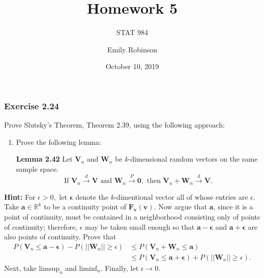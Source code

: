 \documentclass[12pt,]{article}
\title{Homework 5}
\subtitle{STAT 984}
\author{Emily Robinson}
\date{October 10, 2019}
\begin{document}
\maketitle

\hypertarget{exercise-2.24}{%
\subsubsection{Exercise 2.24}\label{exercise-2.24}}

Prove Slutsky's Theorem, Theorem 2.39, using the following approach:

\begin{enumerate}
\def\labelenumi{(\alph{enumi})}
\item
  Prove the following lemma:

  \textbf{Lemma 2.42} Let \(\boldsymbol{V}_n\) and \(\boldsymbol{W}_n\)
  be \textit{k}-dimensional random vectors on the same sample space.
  \[\text{If } \boldsymbol{V}_n\overset{d}\rightarrow \boldsymbol V \text{ and } \boldsymbol{W}_n\overset{P}\rightarrow \boldsymbol 0, \text{ then } \boldsymbol{V}_n + \boldsymbol{W}_n \overset{d}\rightarrow \boldsymbol V.\]
\end{enumerate}

\textbf{Hint:} For \(\epsilon>0,\) let \(\boldsymbol \epsilon\) denote
the \textit{k}-dimentional vector all of whose entries are \(\epsilon.\)
Take \(\boldsymbol a \in \mathbb{R}^k\) to be a continuity point of
\(\boldsymbol{F_v(v)}.\) Now argue that \(\boldsymbol a\), since it is a
point of continuity, must be contained in a neighborhood consisting only
of points of continuity; therefore, \(\epsilon\) may be taken small
enough so that \(\boldsymbol{a-\epsilon}\) and
\(\boldsymbol{a+\epsilon}\) are also points of continuity. Prove that
\begin{align*}
P(\boldsymbol V_n \le \boldsymbol a - \boldsymbol \epsilon) - P(||\boldsymbol W_n|| \ge \epsilon) & \le P(\boldsymbol V_n + \boldsymbol W_n \le \boldsymbol a)\\
& \le P(\boldsymbol V_n \le \boldsymbol a+\boldsymbol \epsilon) + P(||\boldsymbol W_n|| \ge \epsilon).
\end{align*} Next, take \(\text{limsup}_n\) and \(\text{liminf}_n\).
Finally, let \(\epsilon \rightarrow 0.\)
\end{document}
